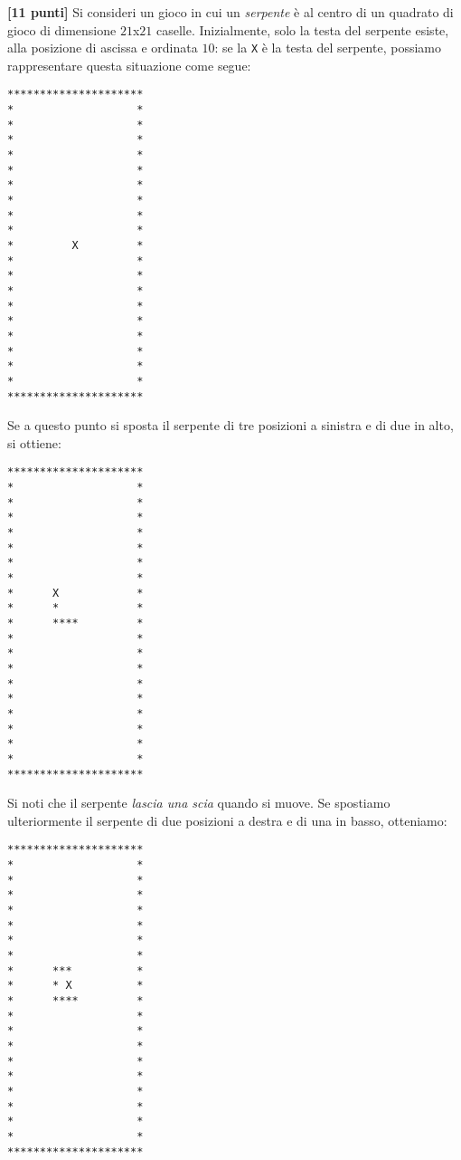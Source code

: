 \documentclass{article}[10pt]
\newcounter{esnu}
\newenvironment{esercizio}{\medskip \noindent {\bf Esercizio\addtocounter{esnu}{1} \arabic{esnu}}}{}
\begin{document}
\begin{esercizio}
\textbf{[11 punti]}
Si consideri un gioco in cui un \emph{serpente} \`e al centro di un quadrato di gioco di dimensione
$21$x$21$ caselle. Inizialmente, solo la testa del serpente esiste, alla posizione di
ascissa e ordinata $10$: se la \texttt{X} \`e la testa del serpente, possiamo rappresentare questa
situazione come segue:
%

{\scriptsize
\begin{verbatim}
*********************
*                   *
*                   *
*                   *
*                   *
*                   *
*                   *
*                   *
*                   *
*                   *
*         X         *
*                   *
*                   *
*                   *
*                   *
*                   *
*                   *
*                   *
*                   *
*                   *
*********************
\end{verbatim}}

\noindent
Se a questo punto si sposta il serpente di tre posizioni a sinistra e di due in alto, si
ottiene:

\newpage
{\scriptsize
\begin{verbatim}
*********************
*                   *
*                   *
*                   *
*                   *
*                   *
*                   *
*                   *
*      X            *
*      *            *
*      ****         *
*                   *
*                   *
*                   *
*                   *
*                   *
*                   *
*                   *
*                   *
*                   *
*********************
\end{verbatim}}

\noindent
Si noti che il serpente \emph{lascia una scia} quando si muove.
Se spostiamo ulteriormente il serpente di due posizioni a destra e di una in basso,
otteniamo:

{\scriptsize
\begin{verbatim}
*********************
*                   *
*                   *
*                   *
*                   *
*                   *
*                   *
*                   *
*      ***          *
*      * X          *
*      ****         *
*                   *
*                   *
*                   *
*                   *
*                   *
*                   *
*                   *
*                   *
*                   *
*********************
\end{verbatim}}


\end{esercizio}
\end{document}
